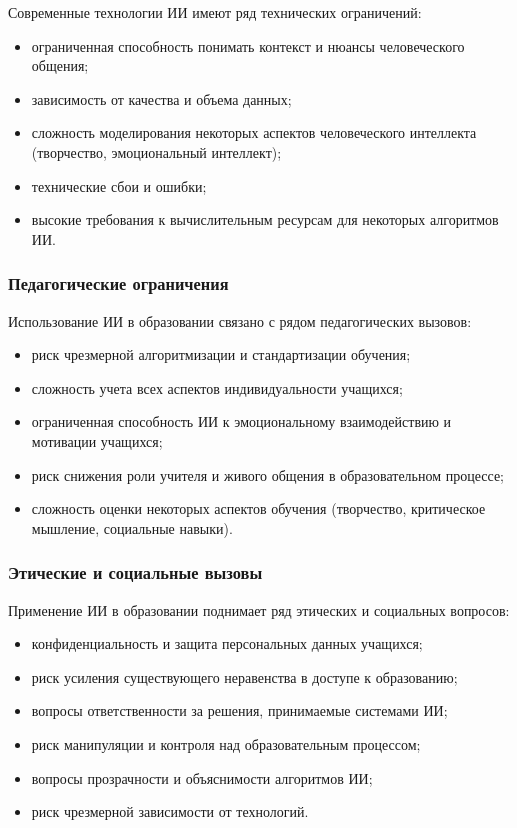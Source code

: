 \documentclass[a4paper,14pt]{extreport}
\begin{document}
Современные технологии ИИ имеют ряд технических ограничений:
\begin{itemize}
    \item ограниченная способность понимать контекст и нюансы человеческого общения;
    \item зависимость от качества и объема данных;
    \item сложность моделирования некоторых аспектов человеческого интеллекта (творчество, эмоциональный интеллект);
    \item технические сбои и ошибки;
    \item высокие требования к вычислительным ресурсам для некоторых алгоритмов ИИ.
\end{itemize}
\subsubsection{Педагогические ограничения}

Использование ИИ в образовании связано с рядом педагогических вызовов:
\begin{itemize}
    \item риск чрезмерной алгоритмизации и стандартизации обучения;
    \item сложность учета всех аспектов индивидуальности учащихся;
    \item ограниченная способность ИИ к эмоциональному взаимодействию и мотивации учащихся;
    \item риск снижения роли учителя и живого общения в образовательном процессе;
    \item сложность оценки некоторых аспектов обучения (творчество, критическое мышление, социальные навыки).
\end{itemize}

\subsubsection{Этические и социальные вызовы}

Применение ИИ в образовании поднимает ряд этических и социальных вопросов:
\begin{itemize}
    \item конфиденциальность и защита персональных данных учащихся;
    \item риск усиления существующего неравенства в доступе к образованию;
    \item вопросы ответственности за решения, принимаемые системами ИИ;
    \item риск манипуляции и контроля над образовательным процессом;
    \item вопросы прозрачности и объяснимости алгоритмов ИИ;
    \item риск чрезмерной зависимости от технологий.
\end{itemize}
\end{document}
